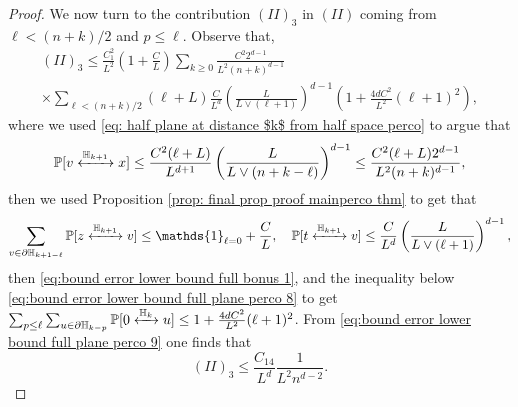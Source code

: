 \documentclass[11pt,a4paper]{article}
\numberwithin{equation}{section}
\theoremstyle{plain}
\theoremstyle{definition}
\newcommand{\connect}{\xleftrightarrow}
\begin{document}
\begin{proof}
We now turn to the contribution $(II)_3$ in $(II)$ coming from $\ell <(n+k)/2$ and $p\leq \ell$. Observe that,
\begin{multline}\label{eq:bound error lower bound full plane perco 9}
	(II)_3\leq \frac{C_1^2}{L^2}\left(1+\frac{C}{L}\right)\sum_{k\geq 0}\frac{C^2 2^{d-1}}{L^2(n+k)^{d-1}}\\\times\sum_{\ell <(n+k)/2}(\ell+L)\frac{C}{L^d}\left(\frac{L}{L\vee (\ell+1)}\right)^{d-1}\left(1+\frac{4dC^2}{L^2}(\ell+1)^2\right),
\end{multline}
where we used \eqref{eq: half plane at distance $k$ from half space perco} to argue that
\begin{equation}\label{eq:bound error lower bound full bonus 2}
	\mathbb P[v\connect{\mathbb H_{k+1}\:}x]\leq \frac{C^2(\ell+L)}{L^{d+1}}\left(\frac{L}{L\vee (n+k-\ell)}\right)^{d-1}\leq \frac{C^2(\ell+L)2^{d-1}}{L^2(n+k)^{d-1}},
\end{equation}
then we used Proposition \ref{prop: final prop proof mainperco thm} to get that 
\begin{equation}
	\sum_{v\in \partial \mathbb H_{k+1-\ell}}\mathbb P[z\connect{\mathbb H_{k+1}\:}v]\leq \mathds{1}_{\ell=0}+\frac{C}{L}, \quad \mathbb P[t\connect{\mathbb H_{k+1}\:}v]\leq \frac{C}{L^d}\left(\frac{L}{L\vee (\ell+1)}\right)^{d-1},
\end{equation}
then \eqref{eq:bound error lower bound full bonus 1}, and the inequality below \eqref{eq:bound error lower bound full plane perco 8} to get $\sum_{p\leq \ell}\sum_{u\in \partial\mathbb H_{k-p}}\mathbb P[0\connect{\mathbb H_k\:}u]\leq 1+\frac{4dC^2}{L^2}(\ell+1)^2$. From \eqref{eq:bound error lower bound full plane perco 9} one finds that
\begin{equation}\label{eq: II 3}
	(II)_3\leq \frac{C_{14}}{L^d}\frac{1}{L^2n^{d-2}}.
\end{equation}


\end{proof}
\end{document}
